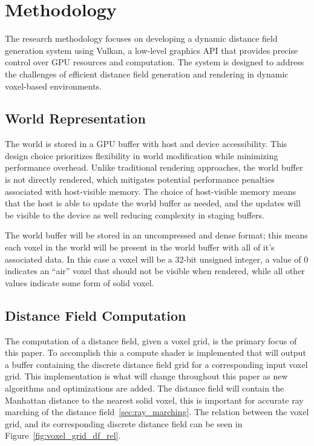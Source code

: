 \chapter{Methodology}
The research methodology focuses on developing a dynamic distance field generation system using Vulkan, a low-level
graphics API that provides precise control over GPU resources and computation. The system is designed to address the
challenges of efficient distance field generation and rendering in dynamic voxel-based environments.

\section{World Representation}
The world is stored in a GPU buffer with host and device accessibility. This design choice prioritizes flexibility in
world modification while minimizing performance overhead. Unlike traditional rendering approaches, the world buffer is
not directly rendered, which mitigates potential performance penalties associated with host-visible memory. The choice
of host-visible memory means that the host is able to update the world buffer as needed, and the updates will be visible
to the device as well reducing complexity in staging buffers.

The world buffer will be stored in an uncompressed and dense format; this means each voxel in the world will be
present in the world buffer with all of it's associated data. In this case a voxel will be a 32-bit unsigned integer, a
value of 0 indicates an ``air'' voxel that should not be visible when rendered, while all other values indicate some
form of solid voxel.

\section{Distance Field Computation}
The computation of a distance field, given a voxel grid, is the primary focus of this paper. To accomplish this a
compute shader is implemented that will output a buffer containing the discrete distance field grid for a corresponding
input voxel grid. This implementation is what will change throughout this paper as new algorithms and optimizations are
added. The distance field will contain the Manhattan distance to the nearest solid voxel, this is important for accurate
ray marching of the distance field~\ref{sec:ray_marching}. The relation between the voxel grid, and its corresponding
discrete distance field can be seen in Figure~\ref{fig:voxel_grid_df_rel}.

